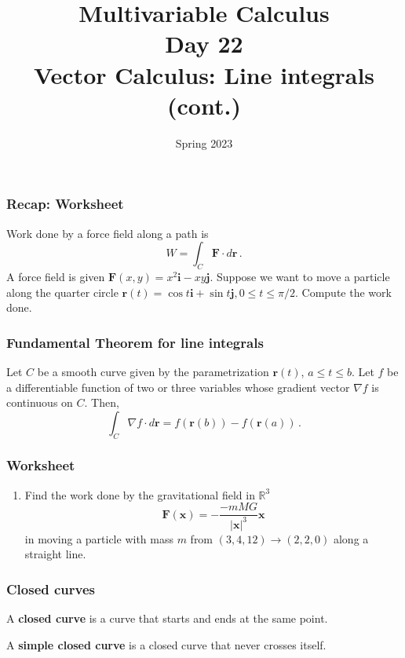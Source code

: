 \documentclass[aspectratio=169]{beamer}
\title{ Multivariable Calculus \\ Day  22 \\ Vector Calculus: Line integrals (cont.)}
\date{Spring 2023}
\newcommand{\vect}{\mathbf}
\newcommand{\R}{\mathbb{R}}
\begin{document}
\maketitle


\begin{frame}
    \frametitle{Recap: Worksheet}
    Work done by a force field along a path is 
    \begin{equation*}
        W = \int_C  \vect{F} \cdot d\vect{r} \,.
    \end{equation*}
    A force field is given $\vect{F}(x,y) = x^2 \vect{i} - xy \vect{j}$.
    Suppose we want to move a particle along the quarter circle
    $\vect{r}(t) = \cos t \vect{i} + \sin t \vect{j}, 0 \leq t \leq \pi/2$.
    Compute the work done.
\end{frame}



\begin{frame}
    \frametitle{Fundamental Theorem for line integrals}
    \begin{theorem}
    Let \(C\) be a smooth curve given by the parametrization \(\mathbf{r}(t)\),
    \(a \leq t \leq b\).
    Let \(f\) be a differentiable function of two or three
    variables whose gradient vector \(\nabla f\) is continuous on \(C\).
    Then,
    \begin{equation*}
        \int_C \nabla f \cdot d\mathbf{r} = f(\mathbf{r}(b)) - f(\mathbf{r}(a)) \,.
    \end{equation*}
    \end{theorem}
\end{frame}


\begin{frame}
    \frametitle{Worksheet}
    \begin{enumerate}
        \item Find the work done by the gravitational field in $\R^3$
            \begin{equation*}
                \vect{F}(\vect{x}) = - \frac{-mMG}{|\vect{x}|^3} \vect{x}
            \end{equation*}
            in moving a particle with mass $m$ from
            $(3,4,12) \to (2,2,0)$ along a straight line.
    \end{enumerate}
\end{frame}

\begin{frame}
    \frametitle{Closed curves}
    \begin{definition}
    A \textbf{closed curve} is a curve that starts and ends at the same point.

    A \textbf{simple closed curve} is a closed curve that never crosses itself.
    \end{definition}
\end{frame}
\end{document}
